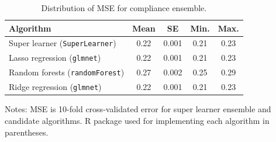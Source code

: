 \documentclass[hidelinks,12pt]{article}
\begin{document}
{\begin{appendices}
\begin{table}[h]
\begin{center}
\caption{Distribution of MSE for compliance ensemble.\label{compliance-ensemble}} 
\begin{tabular}{lcccc}
  \hline
 Algorithm & Mean & SE & Min. & Max. \\ 
  \hline
        \rowcolor{Gray}
Super learner (\texttt{SuperLearner}) & 0.22  & 0.001 & 0.21 & 0.23 \\
Lasso regression (\texttt{glmnet})  & 0.22  & 0.001 & 0.21 & 0.23 \\
Random forests (\texttt{randomForest}) & 0.27  & 0.002 & 0.25 & 0.29 \\
Ridge regression (\texttt{glmnet}) & 0.22  & 0.001 & 0.21 & 0.23 \\
   \hline
\end{tabular} 
\end{center}
\footnotesize{{\color{red}Notes: MSE is 10-fold cross-validated error for super learner ensemble and candidate algorithms. \textsf{R} package used for implementing each algorithm in parentheses.}}
\end{table}

\pagebreak


\end{appendices}}
\end{document}
